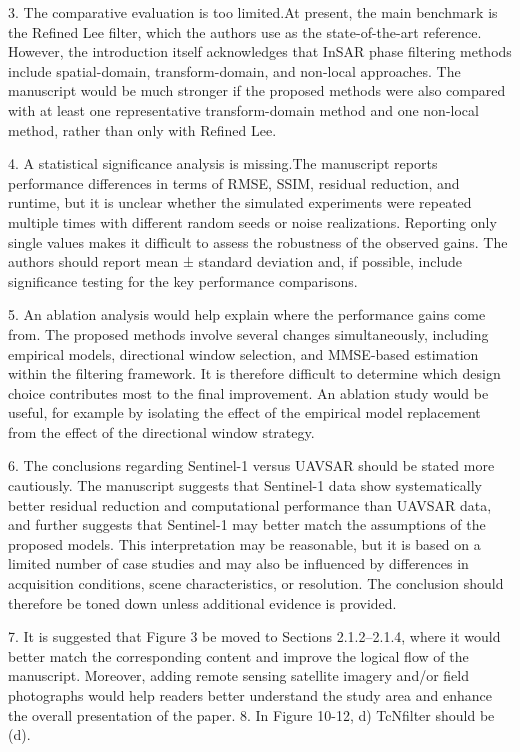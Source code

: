 \documentclass[a4paper,10pt]{article}
\begin{document}
\begin{tcolorbox}[colback=red!5!white,colframe=red!75!black,title=Review Report]
3. The comparative evaluation is too limited.At present, the main benchmark is
the Refined Lee filter, which the authors use as the state-of-the-art reference. However,
the introduction itself acknowledges that InSAR phase filtering methods include
spatial-domain, transform-domain, and non-local approaches. The manuscript would
be much stronger if the proposed methods were also compared with at least one
representative transform-domain method and one non-local method, rather than only
with Refined Lee.

4. A statistical significance analysis is missing.The manuscript reports
performance differences in terms of RMSE, SSIM, residual reduction, and runtime,
but it is unclear whether the simulated experiments were repeated multiple times with
different random seeds or noise realizations. Reporting only single values makes it
difficult to assess the robustness of the observed gains. The authors should report
mean ± standard deviation and, if possible, include significance testing for the key
performance comparisons.

5. An ablation analysis would help explain where the performance gains come
from. The proposed methods involve several changes simultaneously, including
empirical models, directional window selection, and MMSE-based estimation within
the filtering framework. It is therefore difficult to determine which design choice
contributes most to the final improvement. An ablation study would be useful, for
example by isolating the effect of the empirical model replacement from the effect of
the directional window strategy.
\end{tcolorbox}

\begin{tcolorbox}[colback=red!5!white,colframe=red!75!black,title=Review Report continuation.]
6. The conclusions regarding Sentinel-1 versus UAVSAR should be stated more
cautiously. The manuscript suggests that Sentinel-1 data show systematically better
residual reduction and computational performance than UAVSAR data, and further
suggests that Sentinel-1 may better match the assumptions of the proposed models.
This interpretation may be reasonable, but it is based on a limited number of case
studies and may also be influenced by differences in acquisition conditions, scene
characteristics, or resolution. The conclusion should therefore be toned down unless
additional evidence is provided.

7. It is suggested that Figure 3 be moved to Sections 2.1.2–2.1.4, where it would
better match the corresponding content and improve the logical flow of the
manuscript. Moreover, adding remote sensing satellite imagery and/or field
photographs would help readers better understand the study area and enhance the
overall presentation of the paper.
8. In Figure 10-12, d) TcNfilter should be (d).
\end{tcolorbox}
\end{document}
